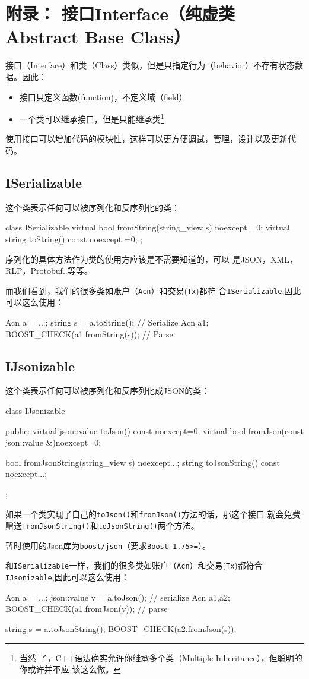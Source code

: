 \documentclass[dvipsnames]{ctexart}
\begin{document}
\section{附录： 接口Interface（纯虚类 Abstract Base Class）}
\label{sec:iface}
接口（Interface）和类（Class）类似，但是只指定行为（behavior）不存有状态数据。因此：
\begin{itemize}
\item 接口只定义函数(function)，不定义域（field）
\item 一个类可以继承接口，但是只能继承类\footnote{当然
    了，C++语法确实允许你继承多个类（Multiple Inheritance），但聪明的你或许并不应
    该这么做。}
\end{itemize}
使用接口可以增加代码的模块性，这样可以更方便调试，管理，设计以及更新代码。

\subsection{ISerializable}
\label{sec:ISerializable}
这个类表示任何可以被序列化和反序列化的类：
\begin{simplec}
  class ISerializable{
    virtual bool fromString(string_view s) noexcept =0;
    virtual string toString() const noexcept =0;
  };
\end{simplec}
序列化的具体方法作为类的使用方应该是不需要知道的，可以
是JSON，XML，RLP，Protobuf..等等。


而我们看到，我们的很多类如账户（\texttt{Acn}）和交易(\texttt{Tx})都符
合\texttt{ISerializable},因此可以这么使用：
\begin{simplec}
Acn a = ...;
string s = a.toString();        // Serialize
Acn a1;
BOOST_CHECK(a1.fromString(s));  // Parse
\end{simplec}
\subsection{IJsonizable}
\label{sec:IJsonizable}

这个类表示任何可以被序列化和反序列化成JSON的类：
\begin{simplec}
  class IJsonizable{
  public:
    virtual json::value toJson() const noexcept=0;
    virtual bool fromJson(const json::value &)noexcept=0;

    bool fromJsonString(string_view s) noexcept{...};
    string toJsonString() const noexcept{...};
  };
\end{simplec}
如果一个类实现了自己的\texttt{toJson()}和\texttt{fromJson()}方法的话，那这个接口
就会免费赠送\texttt{fromJsonString()}和\texttt{toJsonString()}两个方法。

暂时使用的Json库为\texttt{boost/json}（要求\texttt{Boost 1.75>=}）。

和\texttt{ISerializable}一样，我们的很多类如账户（\texttt{Acn}）和交易(\texttt{Tx})都符合\texttt{IJsonizable},因此可以这么使用：
\begin{simplec}
Acn a = ...;
json::value v = a.toJson();     // serialize
Acn a1,a2;
BOOST_CHECK(a1.fromJson(v));    // parse

string s = a.toJsonString();
BOOST_CHECK(a2.fromJson(s));\end{simplec}
\end{document}
